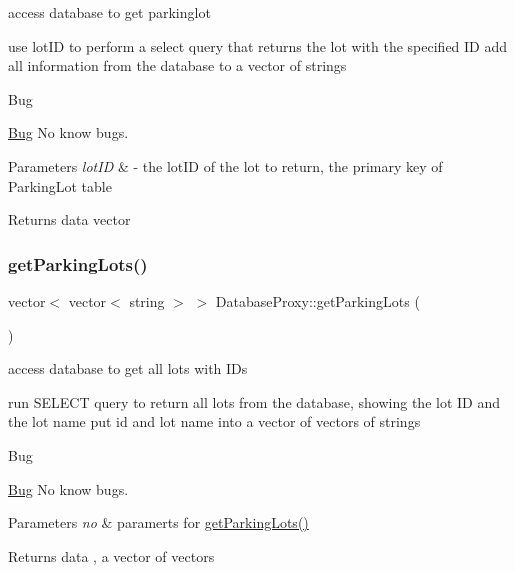 access database to get parkinglot 

use lot\+ID to perform a select query that returns the lot with the specified ID add all information from the database to a vector of strings

\begin{DoxyRefDesc}{Bug}
\item[\mbox{\hyperlink{bug__bug000012}{Bug}}]No know bugs. \end{DoxyRefDesc}

\begin{DoxyParams}{Parameters}
{\em lot\+ID} & -\/ the lot\+ID of the lot to return, the primary key of Parking\+Lot table \\
\hline
\end{DoxyParams}
\begin{DoxyReturn}{Returns}
data vector 
\end{DoxyReturn}
\mbox{\label{class_database_proxy_a81b6e2c6ac50dfbc271a837881fdd869}} 
\subsubsection{\texorpdfstring{get\+Parking\+Lots()}{getParkingLots()}}
{\footnotesize\ttfamily vector$<$ vector$<$ string $>$ $>$ Database\+Proxy\+::get\+Parking\+Lots (\begin{DoxyParamCaption}{ }\end{DoxyParamCaption})}



access database to get all lots with I\+Ds 

run S\+E\+L\+E\+CT query to return all lots from the database, showing the lot ID and the lot name put id and lot name into a vector of vectors of strings

\begin{DoxyRefDesc}{Bug}
\item[\mbox{\hyperlink{bug__bug000013}{Bug}}]No know bugs. \end{DoxyRefDesc}

\begin{DoxyParams}{Parameters}
{\em no} & paramerts for \mbox{\hyperlink{class_database_proxy_a81b6e2c6ac50dfbc271a837881fdd869}{get\+Parking\+Lots()}} \\
\hline
\end{DoxyParams}
\begin{DoxyReturn}{Returns}
data , a vector of vectors 
\end{DoxyReturn}
\mbox{\label{class_database_proxy_a89c65c6817719c84dff2a2f480b0b9cc}} 
